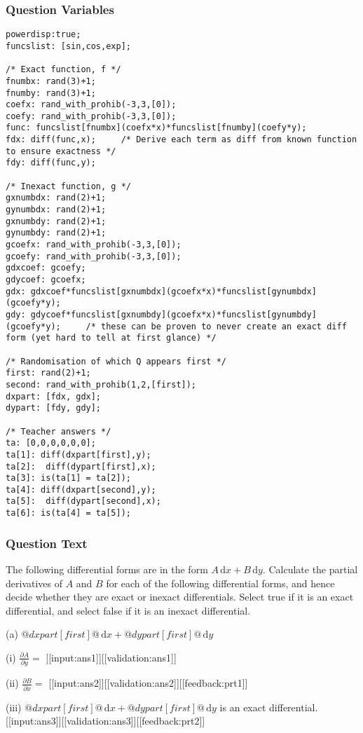 \documentclass[a4paper,10pt]{article}
\begin{document}
\subsubsection{Question Variables}
\begin{lstlisting}
powerdisp:true;
funcslist: [sin,cos,exp];

/* Exact function, f */
fnumbx: rand(3)+1;
fnumby: rand(3)+1;
coefx: rand_with_prohib(-3,3,[0]);
coefy: rand_with_prohib(-3,3,[0]);
func: funcslist[fnumbx](coefx*x)*funcslist[fnumby](coefy*y);
fdx: diff(func,x);     /* Derive each term as diff from known function to ensure exactness */
fdy: diff(func,y);

/* Inexact function, g */
gxnumbdx: rand(2)+1;
gynumbdx: rand(2)+1;
gxnumbdy: rand(2)+1;
gynumbdy: rand(2)+1;
gcoefx: rand_with_prohib(-3,3,[0]);
gcoefy: rand_with_prohib(-3,3,[0]);
gdxcoef: gcoefy;
gdycoef: gcoefx;
gdx: gdxcoef*funcslist[gxnumbdx](gcoefx*x)*funcslist[gynumbdx](gcoefy*y);
gdy: gdycoef*funcslist[gxnumbdy](gcoefx*x)*funcslist[gynumbdy](gcoefy*y);     /* these can be proven to never create an exact diff form (yet hard to tell at first glance) */

/* Randomisation of which Q appears first */
first: rand(2)+1;
second: rand_with_prohib(1,2,[first]);
dxpart: [fdx, gdx];
dypart: [fdy, gdy];

/* Teacher answers */
ta: [0,0,0,0,0,0];
ta[1]: diff(dxpart[first],y);
ta[2]:  diff(dypart[first],x);
ta[3]: is(ta[1] = ta[2]);
ta[4]: diff(dxpart[second],y);
ta[5]:  diff(dypart[second],x);
ta[6]: is(ta[4] = ta[5]);
\end{lstlisting}
\subsubsection{Question Text}
The following differential forms are in the form \(A \, \text{d}x + B \, \text{d}y\). Calculate the partial derivatives of \(A\) and \(B\) for each of the following differential forms, and hence decide whether they are exact or inexact differentials. Select true if it is an exact differential, and select false if it is an inexact differential.

(a) \(@dxpart[first]@ \, \text{d}x + @dypart[first]@ \, \text{d}y\) 

(i) \(\frac{\partial A}{\partial y} = \) [[input:ans1]][[validation:ans1]] 

(ii) \(\frac{\partial B}{\partial x} = \) [[input:ans2]][[validation:ans2]][[feedback:prt1]]

(iii) \(@dxpart[first]@ \, \text{d}x + @dypart[first]@ \, \text{d}y\) is an exact differential. [[input:ans3]][[validation:ans3]][[feedback:prt2]]
\end{document}
